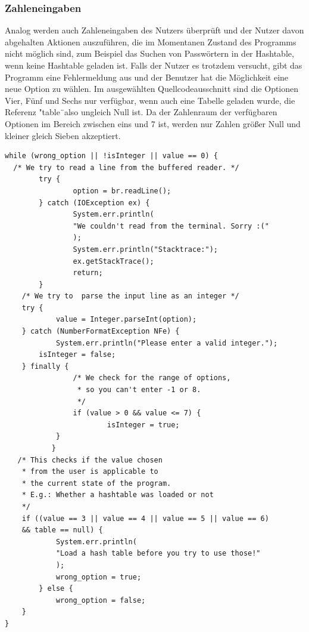 \documentclass[11pt]{article}
\begin{document}
  \subsubsection{Zahleneingaben}
Analog werden auch Zahleneingaben des Nutzers überprüft und der Nutzer davon abgehalten Aktionen auszuführen, die im Momentanen Zustand des Programms nicht möglich sind, zum Beispiel das Suchen von Passwörtern in der Hashtable, wenn keine Hashtable geladen ist.
 Falls der Nutzer es trotzdem versucht, gibt das Programm eine Fehlermeldung aus und der Benutzer hat die Möglichkeit eine neue Option zu wählen.
Im ausgewählten Quellcodeausschnitt sind die Optionen Vier, Fünf und Sechs nur verfügbar, wenn auch eine Tabelle geladen wurde, die Referenz "table\"\ also ungleich Null ist. Da der Zahlenraum der verfügbaren Optionen im Bereich zwischen eins und 7 ist, werden nur Zahlen größer Null und kleiner gleich Sieben akzeptiert.\\
\begin{lstlisting}[caption=Überprüfung von Zahlen, label=lst:checkIntegers]
while (wrong_option || !isInteger || value == 0) {
  /* We try to read a line from the buffered reader. */
        try {
                option = br.readLine();
        } catch (IOException ex) {
                System.err.println(
                "We couldn't read from the terminal. Sorry :("
                );
                System.err.println("Stacktrace:");
                ex.getStackTrace();
                return;
        }
    /* We try to  parse the input line as an integer */
    try {
            value = Integer.parseInt(option);
    } catch (NumberFormatException NFe) {
            System.err.println("Please enter a valid integer.");
        isInteger = false;
    } finally {
                /* We check for the range of options, 
                 * so you can't enter -1 or 8. 
                 */
                if (value > 0 && value <= 7) {
                        isInteger = true;
            }
           }
   /* This checks if the value chosen 
    * from the user is applicable to 
    * the current state of the program.
    * E.g.: Whether a hashtable was loaded or not 
    */
    if ((value == 3 || value == 4 || value == 5 || value == 6) 
    && table == null) {
            System.err.println(
            "Load a hash table before you try to use those!"
            );
            wrong_option = true;
        } else {
            wrong_option = false;
    }
}
  \end{lstlisting}
\end{document}
